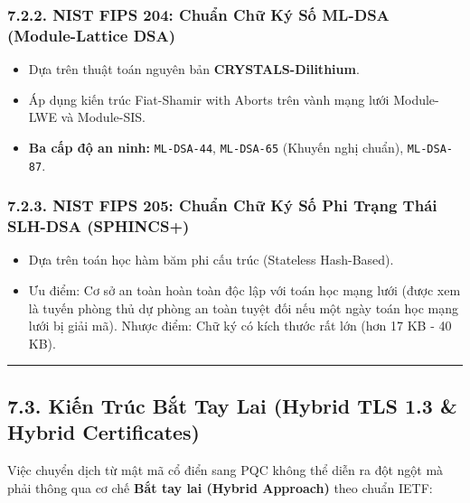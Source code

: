 \documentclass[
]{article}
\providecommand{\tightlist}{%
  \setlength{\itemsep}{0pt}\setlength{\parskip}{0pt}}
\begin{document}
\subsubsection{7.2.2. NIST FIPS 204: Chuẩn Chữ Ký Số ML-DSA
(Module-Lattice
DSA)}\label{nist-fips-204-chuux1ea9n-chux1eef-kuxfd-sux1ed1-ml-dsa-module-lattice-dsa}

\begin{itemize}
\tightlist
\item
  Dựa trên thuật toán nguyên bản \textbf{CRYSTALS-Dilithium}.
\item
  Áp dụng kiến trúc Fiat-Shamir with Aborts trên vành mạng lưới
  Module-LWE và Module-SIS.
\item
  \textbf{Ba cấp độ an ninh:} \texttt{ML-DSA-44}, \texttt{ML-DSA-65}
  (Khuyến nghị chuẩn), \texttt{ML-DSA-87}.
\end{itemize}

\subsubsection{7.2.3. NIST FIPS 205: Chuẩn Chữ Ký Số Phi Trạng Thái
SLH-DSA
(SPHINCS+)}\label{nist-fips-205-chuux1ea9n-chux1eef-kuxfd-sux1ed1-phi-trux1ea1ng-thuxe1i-slh-dsa-sphincs}

\begin{itemize}
\tightlist
\item
  Dựa trên toán học hàm băm phi cấu trúc (Stateless Hash-Based).
\item
  Ưu điểm: Cơ sở an toàn hoàn toàn độc lập với toán học mạng lưới (được
  xem là tuyến phòng thủ dự phòng an toàn tuyệt đối nếu một ngày toán
  học mạng lưới bị giải mã). Nhược điểm: Chữ ký có kích thước rất lớn
  (hơn 17 KB - 40 KB).
\end{itemize}

\begin{center}\rule{0.5\linewidth}{0.5pt}\end{center}

\subsection{7.3. Kiến Trúc Bắt Tay Lai (Hybrid TLS 1.3 \& Hybrid
Certificates)}\label{kiux1ebfn-truxfac-bux1eaft-tay-lai-hybrid-tls-1.3-hybrid-certificates}

Việc chuyển dịch từ mật mã cổ điển sang PQC không thể diễn ra đột ngột
mà phải thông qua cơ chế \textbf{Bắt tay lai (Hybrid Approach)} theo
chuẩn IETF:
\end{document}

